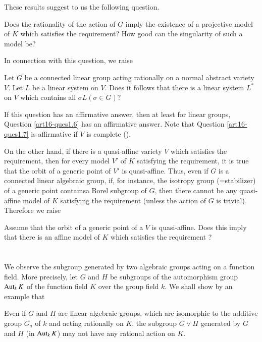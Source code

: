 These results suggest to us the following question.

\begin{question}\label{art16-ques1.6}
Does the rationality of the action of $G$ imply the existence of a projective model of $K$ which satisfies the requirement? How good can the singularity of such a model be?
\end{question}

In connection with this question, we raise

\begin{question}\label{art16-ques1.7}
Let $G$ be a connected linear group acting rationally on a normal abstract variety $V$. Let $L$ be a linear system on $V$. Does it follows that there is a linear system $L^{*}$ on $V$ which contains all $\sigma L(\sigma\in G)$?
\end{question}

If this question has an affirmative answer, then at least for linear groups, Question \ref{art16-ques1.6} has an affirmative answer. Note that Question \ref{art16-ques1.7} is affirmative if $V$ is complete (\cite{art16-key-K}).

On the other hand, if there is a quasi-affine variety $V$ which satisfies the requirement, then for every model $V'$ of $K$ satisfying the requirement, it is true that the orbit of a generic point of $V'$ is quasi-affine. Thus, even if $G$ is a connected linear algebraic group, if, for instance, the isotropy group (=stabilizer) of a generic point contains\pageoriginale a Borel subgroup of $G$, then there cannot be any quasi-affine model of $K$ satisfying the requirement (unless the action of $G$ is trivial). Therefore we raise

\begin{question}\label{art16-ques1.8}
Assume that the orbit of a generic point of a $V$ is quasi-affine. Does this imply that there is an affine model of $K$ which satisfies the requirement ?
\end{question}

\section{}\label{art16-sec2}
We observe the subgroup generated by two algebraic groups acting on a function field. More precisely, let $G$ and $H$ be subgroups of the automorphism group $\operatorname{\mathrm{Aut}}_{k}K$ of the function field $K$ over the group field $k$. We shall show by an example that

\begin{proposition}\label{art16-prop2.1}
Even if $G$ and $H$ are linear algebraic groups, which are isomorphic to the additive group $G_{a}$ of $k$ and acting rationally on $K$, the subgroup $G\vee H$ generated by $G$ and $H$ (in $\operatorname{\mathrm{Aut}}_{k}K$) may not have any rational action on $K$.
\end{proposition}

